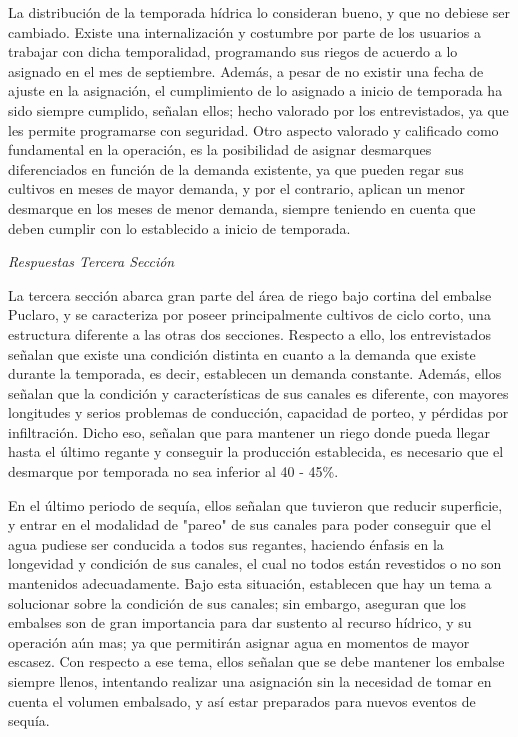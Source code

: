 \documentclass[11pt,]{article}
\begin{document}
La distribución de la temporada hídrica lo consideran bueno, y que no debiese ser cambiado. Existe una internalización y costumbre por parte de los usuarios a trabajar con dicha temporalidad, programando sus riegos de acuerdo a lo asignado en el mes de septiembre. Además, a pesar de no existir una fecha de ajuste en la asignación, el cumplimiento de lo asignado a inicio de temporada ha sido siempre cumplido, señalan ellos; hecho valorado por los entrevistados, ya que les permite programarse con seguridad. Otro aspecto valorado y calificado como fundamental en la operación, es la posibilidad de asignar desmarques diferenciados en función de la demanda existente, ya que pueden regar sus cultivos en meses de mayor demanda, y por el contrario, aplican un menor desmarque en los meses de menor demanda, siempre teniendo en cuenta que deben cumplir con lo establecido a inicio de temporada.
 
 \bigskip
\textit {Respuestas Tercera Sección}\bigskip
 
 La tercera sección abarca gran parte del área de riego bajo cortina del embalse Puclaro, y se caracteriza por poseer principalmente cultivos de ciclo corto, una estructura diferente a las otras dos secciones. Respecto a ello, los entrevistados señalan que existe una condición distinta en cuanto a la demanda que existe durante la temporada, es decir, establecen un demanda constante. Además, ellos señalan que la condición y características de sus canales es diferente, con mayores longitudes y serios problemas de conducción, capacidad de porteo, y pérdidas por infiltración. Dicho eso, señalan que para mantener un riego donde pueda llegar hasta el último regante y conseguir la producción establecida, es necesario que el desmarque por temporada no sea inferior al 40 - 45\%. \bigskip
 
 En el último periodo de sequía, ellos señalan que tuvieron que reducir superficie, y entrar en el modalidad de "pareo" de sus canales para poder conseguir que el agua pudiese ser conducida a todos sus regantes, haciendo énfasis en la longevidad y condición de sus canales, el cual no todos están revestidos o no son mantenidos adecuadamente. Bajo esta situación, establecen que hay un tema a solucionar sobre la condición de sus canales; sin embargo, aseguran que los embalses son de gran importancia para dar sustento al recurso hídrico, y su operación aún mas; ya que permitirán asignar agua en momentos de mayor escasez. Con respecto a ese tema, ellos señalan que se debe mantener los embalse siempre llenos, intentando realizar una asignación sin la necesidad de tomar en cuenta el volumen embalsado, y así estar preparados para nuevos eventos de sequía. \bigskip
  
\end{document}
